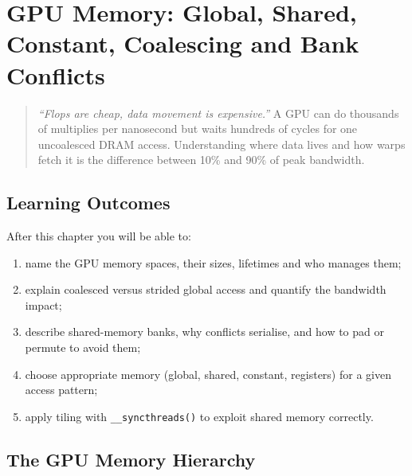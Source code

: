 \chapter{GPU Memory: Global, Shared, Constant, Coalescing and Bank Conflicts}
\label{ch:memory}
\sloppy

\begin{quote}
\emph{``Flops are cheap, data movement is expensive.''} A GPU can do thousands of multiplies per nanosecond but waits hundreds of cycles for one uncoalesced DRAM access. Understanding where data lives and how warps fetch it is the difference between 10\% and 90\% of peak bandwidth.
\end{quote}

\noindent{}
\vspace{0.4em}

\section*{Learning Outcomes}
After this chapter you will be able to:
\begin{enumerate}[label=(L\arabic*)]
    \item name the GPU memory spaces, their sizes, lifetimes and who manages them;
    \item explain coalesced versus strided global access and quantify the bandwidth impact;
    \item describe shared-memory banks, why conflicts serialise, and how to pad or permute to avoid them;
    \item choose appropriate memory (global, shared, constant, registers) for a given access pattern;
    \item apply tiling with \texttt{\_\_syncthreads()} to exploit shared memory correctly.
\end{enumerate}

\section{The GPU Memory Hierarchy}
\label{sec:mem-hierarchy}
